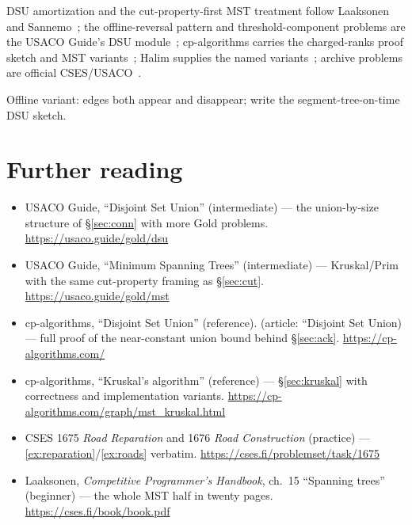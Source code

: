 \chapternotes
DSU amortization and the cut-property-first MST treatment follow
Laaksonen~\cite{laaksonen2024} and Sannemo~\cite{sannemo2025}; the
offline-reversal pattern and threshold-component problems are the
USACO Guide's DSU module~\cite{usacoguide}; cp-algorithms carries the
charged-ranks proof sketch and MST variants~\cite{cpalgorithms};
Halim supplies the named variants~\cite{halimcp4}; archive problems
are official CSES/USACO~\cite{cses}.
\begin{exercise}[hard] Offline variant: edges both appear and disappear; write the segment-tree-on-time DSU sketch. \end{exercise}

\section*{Further reading}
\begin{itemize}
\item USACO Guide, ``Disjoint Set Union'' (intermediate) --- the union-by-size structure of
\S\ref{sec:conn} with more Gold problems. \newline\url{https://usaco.guide/gold/dsu}
\item USACO Guide, ``Minimum Spanning Trees'' (intermediate) --- Kruskal/Prim with the same
cut-property framing as \S\ref{sec:cut}. \newline\url{https://usaco.guide/gold/mst}
\item cp-algorithms, ``Disjoint Set Union'' (reference). (article: ``Disjoint Set Union)
--- full proof of the near-constant union bound behind
\S\ref{sec:ack}. \newline\url{https://cp-algorithms.com/}
\item cp-algorithms, ``Kruskal's algorithm'' (reference) ---
\S\ref{sec:kruskal} with correctness and implementation variants. \newline\url{https://cp-algorithms.com/graph/mst_kruskal.html}
\item CSES 1675 \emph{Road Reparation} and 1676 \emph{Road
Construction} (practice) ---
\ref{ex:reparation}/\ref{ex:roads} verbatim. \newline\url{https://cses.fi/problemset/task/1675}
\item Laaksonen, \emph{Competitive Programmer's Handbook}, ch.~15
``Spanning trees'' (beginner) ---
the whole MST half in twenty pages. \newline\url{https://cses.fi/book/book.pdf}\end{itemize}

